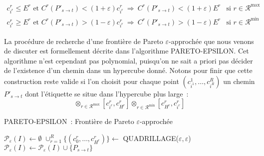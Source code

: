\documentclass[10pt,francais]{llncs}
\begin{document}
{$$\begin{array}{ll}
c^r_{i^r}\leq E^r\textrm{ et }C^r(P'_{s \to t}) < (1+\varepsilon)c^r_{i^r}\  
	\Rightarrow\ C^r(P'_{s \to t}) < (1+\varepsilon)E^r		&\textrm{si }r\in \mathscr{R}^{\max}\\[10pt]
c^r_{i^r}\geq E^r\textrm{ et }C^r(P'_{s \to t}) > (1-\varepsilon)c^r_{i^r}\  
	\Rightarrow\ C^r(P'_{s \to t}) > (1-\varepsilon)E^r 
&\textrm{si }r\in \mathscr{R}^{\min}
\end{array}$$

La proc\'edure de recherche d'une fronti\`ere de Pareto $\varepsilon$-approch\'ee que nous venons de discuter est formellement d\'ecrite dans l'algorithme PARETO-EPSILON. Cet algorithme n'est cependant pas polynomial, puisqu'on ne sait a priori pas d\'ecider de l'existence d'un chemin dans un hypercube donn\'e. Notons pour finir que cette construction reste valide si l'on choisit pour chaque point $(c^1_{i^1},\ldots,c^R_{i^R})$ un chemin $P'_{s \to t}$ dont l'\'etiquette se situe dans l'hypercube plus large~:
$$\displaystyle{ \otimes_{r\in \mathscr{R}^{\max}}[c^r_{i^r},c^r_{H^r}] \otimes_{r\in \mathscr{R}^{\min}}[c^r_{H^r},c^r_{i^r}]}$$


\begin{algorithm}\label{algo-pareto-epsilon}
\caption{PARETO-EPSILON~: Fronti\`ere de Pareto $\varepsilon$-approch\'ee}
\Entree{$I$ instance, $\varepsilon\in]0,1[$ erreur}
\BlankLine
{}
\BlankLine
$\mathscr{P}_\varepsilon(I) \leftarrow \emptyset$\;
$\cup_{r=1}^R\{(c^r_0,\ldots,c^r_{H^r})\} \leftarrow$ QUADRILLAGE($\varepsilon,\varepsilon$)\;
{
		{$\mathscr{P}_\varepsilon(I) \leftarrow \mathscr{P}_\varepsilon(I)\cup\{P_{s \to t}\}$\;} 
}
\end{algorithm}

}
\end{document}
